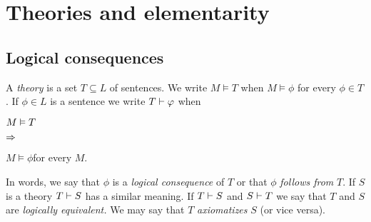 \chapter{Theories and elementarity}
\label{teorie}

\def\medrel#1{\parbox[t]{6ex}{$\displaystyle\hfil #1$}}
\def\ceq#1#2#3{\parbox{15ex}{$\displaystyle #1$}\medrel{#2}$\displaystyle  #3$}

\section{Logical consequences}\label{conseguenzelogiche}
% 
% 
% 
% 
% 
% 

A \emph{theory\/} is a set $T\subseteq L$ of sentences.
We write \emph{$M\models T$\/} when $M\models\phi$ for every $\phi\in T$.
If $\phi\in L$ is a sentence we write \emph{$T\vdash\varphi$\/} when

\ceq{\hfill M\models T}{\IMP}{M\models\phi}\qquad for every $M$.

In words, we say that $\phi$ is a \emph{logical consequence\/} of $T$ or that $\phi$ \emph{follows from\/} $T$.
If $S$ is a theory \emph{$T\vdash S$\/} has a similar meaning.
If $T\vdash S$ and $S\vdash T$ we say that $T$ and $S$ are \emph{logically equivalent.}
We may say that $T$ \emph{axiomatizes\/} $S$ (or vice versa).

